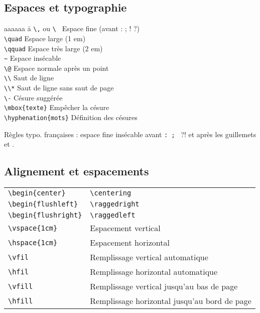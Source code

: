 \documentclass{article}
\newenvironment{tighttabbing}
  {\begingroup\setlength{\parskip}{0pt}\begin{tabbing}}
  {\end{tabbing}\endgroup}
\let\code\lstinline
\begin{document}
\begin{multicols*}{3}

\subsection*{Espaces et typographie}
\begin{multicols*}{2}
\begin{tighttabbing}
    aaaaaa \= a \kill
\code!\,! ou \code!\ !    \> Espace fine (avant : ; ! ?)   \\
    \code!\quad!          \> Espace large (1 em)           \\
    \code!\qquad!         \> Espace très large (2 em)      \\
    \code!~!              \> Espace insécable              \\
    \code!\@!             \> Espace normale après un point \\
    \code!\\!             \> Saut de ligne \\
    \code!\\*!            \> Saut de ligne sans saut de page \\
    \code!\-!                 \> Césure suggérée               \\
    \code!\mbox{texte}!        Empêcher la césure            \\
    \code!\hyphenation{mots}!  Définition des césures
\end{tighttabbing}
\end{multicols*}


Règles typo. françaises : espace fine insécable avant \code!: ; ! ?! et après les guillemets \og{} et \fg{}.


\subsection*{Alignement et espacements}
\begin{tabular}{*2{>{}l}}
\code!\begin{center}! & \code!\centering! \\
\code!\begin{flushleft}! & \code!\raggedright! \\
\code!\begin{flushright}! & \code!\raggedleft! \\
\code!\vspace{1cm}! & Espacement vertical \\
\code!\hspace{1cm}! & Espacement horizontal \\
\code!\vfil! & Remplissage vertical automatique \\
\code!\hfil! & Remplissage horizontal automatique \\
\code!\vfill! & Remplissage vertical jusqu'au bas de page \\
\code!\hfill! & Remplissage horizontal jusqu'au bord de page \\
\end{tabular}


\end{multicols*}
\end{document}
